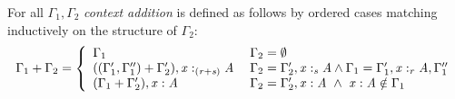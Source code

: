 \begin{definition}\label{def:contextAdd}
  For all $\Gamma_{{\mathrm{1}}}, \Gamma_{{\mathrm{2}}}$
  \emph{context addition} is defined
as follows by ordered cases matching inductively on the structure of
$\Gamma_{{\mathrm{2}}}$:
\begin{align*}
\Gamma_{{\mathrm{1}}}  \GRANULEsym{+}  \Gamma_{{\mathrm{2}}} = \left\{\begin{matrix}
    \begin{array}{ll}
    \Gamma_{{\mathrm{1}}} &
     \Gamma_{{\mathrm{2}}} = \emptyset
             \\
      ((\Gamma'_{{\mathrm{1}}}, \Gamma''_{{\mathrm{1}}}) + \Gamma'_{{\mathrm{2}}}), \GRANULEmv{x}  :_{\textcolor{coeffectColor}{  \GRANULEsym{(}  \GRANULEnt{r}  \GRANULEsym{+}  \GRANULEnt{s}  \GRANULEsym{)}  } }   \GRANULEnt{A} \; &
\Gamma_{{\mathrm{2}}} = \Gamma'_{{\mathrm{2}}}  \GRANULEsym{,}   \GRANULEmv{x}  :_{\textcolor{coeffectColor}{  \GRANULEnt{s}  } }   \GRANULEnt{A} \wedge \Gamma_{{\mathrm{1}}} = \Gamma'_{{\mathrm{1}}}  \GRANULEsym{,}   \GRANULEmv{x}  :_{\textcolor{coeffectColor}{  \GRANULEnt{r}  } }   \GRANULEnt{A},\Gamma''_{{\mathrm{1}}}  \\
 (\Gamma_{{\mathrm{1}}} + \Gamma'_{{\mathrm{2}}}), \GRANULEmv{x}  :  \GRANULEnt{A} & \Gamma_{{\mathrm{2}}} = \Gamma'_{{\mathrm{2}}}  \GRANULEsym{,}   \GRANULEmv{x}  :  \GRANULEnt{A}\ \wedge\  \GRANULEmv{x}  :  \GRANULEnt{A} \notin \Gamma_{{\mathrm{1}}}
    \end{array}
  \end{matrix}\right.
\end{align*}
\end{definition}




